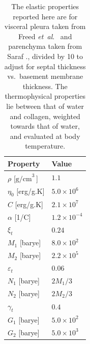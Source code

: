 \begin{table}
    \centering
    \begin{tabular}{|l|l|}
        \hline
        Property & Value \\ \hline
        $\rho$ \hfill [$\textrm{g/cm}^{3^{\phantom{|}}}$] & $1.1$ \\
        $\eta_0$ \hfill [erg/g.K] & $5.0 \times 10^6$ \\
        $C$ \hfill [erg/g.K] & $2.1 \times 10^7$ \\
        $\alpha$ \hfill [1/C] & $1.2 \times 10^{-4}$ \\ \hline
        $\xi_t$ & $0.24$ \\
        $M_1$ \hfill [barye] & $8.0 \times 10^2$ \\
        $M_2$ \hfill [barye] & $2.2 \times 10^5$ \\ \hline
        $\varepsilon_t$ & $0.06$ \\
        $N_1$ \hfill [barye] & $2M_1/3$ \\
        $N_2$ \hfill [barye] & $2M_2/3$ \\ \hline
        $\gamma_t$ & $0.4$ \\
        $G_1$ \hfill [barye] & $5.0 \times 10^2$ \\
        $G_2$ \hfill [barye] & $5.0 \times 10^3$ \\ \hline
    \end{tabular}
    \caption{The elastic properties reported here are for visceral pleura taken from Freed \textit{et~al}.\ \cite{Freedetal17} and parenchyma taken from Saraf ., \cite{Sarafetal07} divided by 10 to adjust for septal thickness vs.\ basement membrane thickness.  The thermo\-physical properties lie between that of water and collagen, weighted towards that of water, and evaluated at body temperature.}
    \label{tableVisceralPleura}
\end{table}

